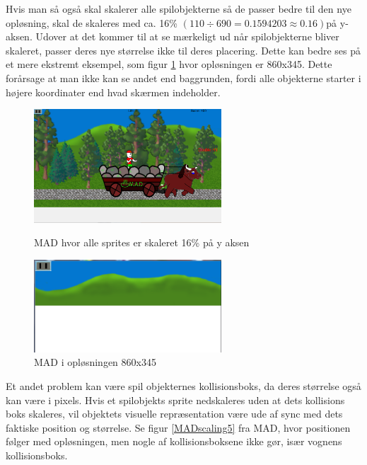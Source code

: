 \documentclass[Main.tex]{PositionOgSkalering}
\begin{document}
Hvis man så også skal skalerer alle spilobjekterne så de passer bedre til den nye opløsning, skal de skaleres med ca. 16\% \begin{math} (110 \div 690  = 0.1594203 \approx 0.16) \end{math}på y-aksen. Udover at det kommer til at se mærkeligt ud når spilobjekterne bliver skaleret, passer deres nye størrelse ikke til deres placering. Dette kan bedre ses på et mere ekstremt eksempel, som figur \ref{MADscaling4} hvor opløsningen er 860x345. Dette forårsage at man ikke kan se andet end baggrunden, fordi alle objekterne starter i højere koordinater end hvad skærmen indeholder.

\begin{figure}[h]
\centering
\parbox{7cm}{   
\includegraphics[width = 7cm]{billeder/MADscaling3}
\caption{MAD hvor alle sprites er skaleret 16\% på y aksen}    
\label{MADscaling3}}
\qquad
\begin{minipage}{7cm}
\includegraphics[width = 7cm]{billeder/MADscaling4}
\caption{MAD i opløsningen 860x345}    
\label{MADscaling4}
\end{minipage}
\end{figure}

Et andet problem kan være spil objekternes kollisionsboks, da deres størrelse også kan være i pixels. Hvis et spilobjekts sprite nedskaleres uden at dets kollisions boks skaleres, vil objektets visuelle repræsentation være ude af sync med dets faktiske position og størrelse. Se figur \ref{MADscaling5} fra MAD, hvor positionen følger med opløsningen, men nogle af kollisionsboksene ikke gør, især vognens kollisionsboks. 
\end{document}
